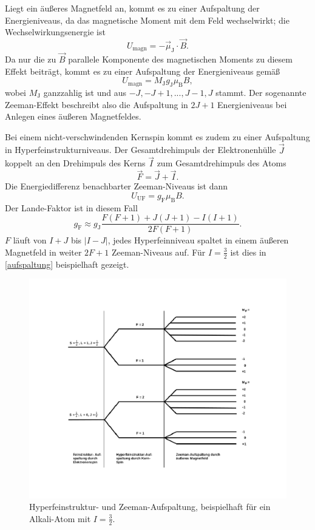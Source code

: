 Liegt ein äußeres Magnetfeld an, kommt es zu einer Aufspaltung der Energieniveaus, da das magnetische Moment mit dem Feld
wechselwirkt; die Wechselwirkungsenergie ist
\begin{equation}
  U_\text{magn} = -\vec{\mu}_\text{J}\cdot\vec{B}.
\end{equation}
Da nur die zu $\vec{B}$ parallele Komponente des magnetischen Moments zu diesem Effekt beiträgt, kommt es zu einer Aufspaltung
der Energieniveaus gemäß
\begin{equation}
  U_\text{magn} = M_\text{J}g_\text{J}\mu_\text{B}B,
\end{equation}
wobei $M_\text{J}$ ganzzahlig ist und aus $-J, -J+1, ..., J-1, J$ stammt. Der sogenannte Zeeman-Effekt beschreibt also die
Aufspaltung in $2J+1$ Energieniveaus bei Anlegen eines äußeren Magnetfeldes.

Bei einem nicht-verschwindenden Kernspin kommt es zudem zu einer Aufspaltung in Hyperfeinstrukturniveaus.
Der Gesamtdrehimpuls der Elektronenhülle $\vec{J}$ koppelt an den Drehimpuls des Kerns $\vec{I}$ zum Gesamtdrehimpuls des Atoms
\begin{equation}
  \vec{F} = \vec{J} + \vec{I}.
\end{equation}
Die Energiedifferenz benachbarter Zeeman-Niveaus ist dann
\begin{equation}
  U_\text{UF} = g_\text{F}\mu_\text{B}B.
\end{equation}
Der Lande-Faktor ist in diesem Fall
\begin{equation}
  g_\text{F} \approx g_\text{J}\frac{F(F+1)+J(J+1)-I(I+1)}{2F(F+1)}.
\end{equation}
$F$ läuft von $I+J$ bis $|I-J|$, jedes Hyperfeinniveau spaltet in einem äußeren Magnetfeld in weiter $2F+1$ Zeeman-Niveaus
auf. Für $I=\frac{3}{2}$ ist dies in \autoref{aufspaltung} beispielhaft gezeigt.
\begin{figure}
  \includegraphics{optischesPumpen/img/aufspaltung.pdf}
  \caption{Hyperfeinstruktur- und Zeeman-Aufspaltung, beispielhaft für ein Alkali-Atom mit $I=\frac{3}{2}$.}
  \label{aufspaltung}
\end{figure}

